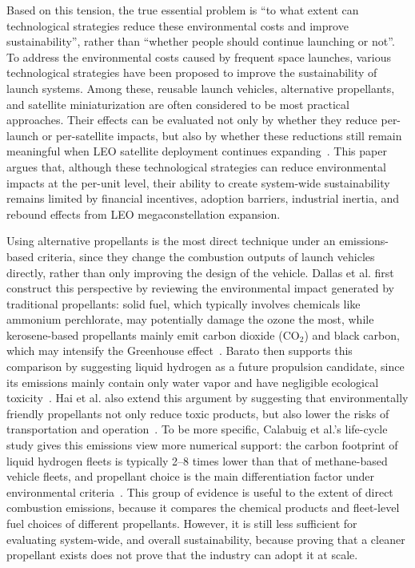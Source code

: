 \documentclass[12pt]{article}
\begin{document}
Based on this tension, the true essential problem is ``to what extent can technological strategies reduce these environmental costs and improve sustainability'', rather than ``whether people should continue launching or not''. To address the environmental costs caused by frequent space launches, various technological strategies have been proposed to improve the sustainability of launch systems. Among these, reusable launch vehicles, alternative propellants, and satellite miniaturization are often considered to be most practical approaches. Their effects can be evaluated not only by whether they reduce per-launch or per-satellite impacts, but also by whether these reductions still remain meaningful when LEO satellite deployment continues expanding~\citep{wilson2022lifecycle,osoro2025leo}. This paper argues that, although these technological strategies can reduce environmental impacts at the per-unit level, their ability to create system-wide sustainability remains limited by financial incentives, adoption barriers, industrial inertia, and rebound effects from LEO megaconstellation expansion.



Using alternative propellants is the most direct technique under an emissions-based criteria, since they change the combustion outputs of launch vehicles directly, rather than only improving the design of the vehicle. Dallas et al. first construct this perspective by reviewing the environmental impact generated by traditional propellants: solid fuel, which typically involves chemicals like ammonium perchlorate, may potentially damage the ozone the most, while kerosene-based propellants mainly emit carbon dioxide (CO$_2$) and black carbon, which may intensify the Greenhouse effect~\citep{dallas2020review}. Barato then supports this comparison by suggesting liquid hydrogen as a future propulsion candidate, since its emissions mainly contain only water vapor and have negligible ecological toxicity~\citep{barato2023fuels}. Hai et al. also extend this argument by suggesting that environmentally friendly propellants not only reduce toxic products, but also lower the risks of transportation and operation~\citep{hai2026propellants}. To be more specific, Calabuig et al.'s life-cycle study gives this emissions view more numerical support: the carbon footprint of liquid hydrogen fleets is typically 2--8 times lower than that of methane-based vehicle fleets, and propellant choice is the main differentiation factor under environmental criteria~\citep{calabuig2024reusable}. This group of evidence is useful to the extent of direct combustion emissions, because it compares the chemical products and fleet-level fuel choices of different propellants. However, it is still less sufficient for evaluating system-wide, and overall sustainability, because proving that a cleaner propellant exists does not prove that the industry can adopt it at scale.
\end{document}
